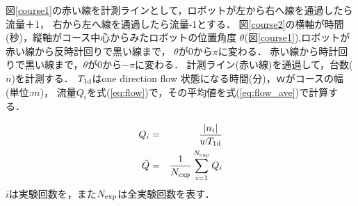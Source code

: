 図\ref{course1}の赤い線を計測ラインとして，ロボットが左から右へ線を通過したら流量＋1，
右から左へ線を通過したら流量-1とする．
図\ref{course2}の横軸が時間(秒)，縦軸がコース中心からみたロボットの位置角度
$\theta$(図\ref{course1}),ロボットが赤い線から反時計回りで黒い線まで，
$\theta$が0から$\pi$に変わる．
赤い線から時計回りで黒い線まで，$\theta$が0から$-\pi$に変わる．
計測ライン(赤い線)を通過して，台数($n$)を計測する．
$T_{\rm 1d}$はone direction flow 状態になる時間(分)，$ｗ$がコースの幅(単位:$m$)，
流量$Q_i$を式(\ref{eq:flow})で，その平均値を式(\ref{eq:flow_ave})で計算する．

\begin{eqnarray}
Q_i &=& \frac{|n_i|}{wT_{\rm 1d}}
\label{eq:flow} \\
\bar{Q} &=& \frac{1}{N_{\rm exp}}\sum_{i=1}^{N_{\rm exp}} Q_i
\label{eq:flow_ave} 
\end{eqnarray}
$i$は実験回数を，また$N_{\rm exp}$は全実験回数を表す．

